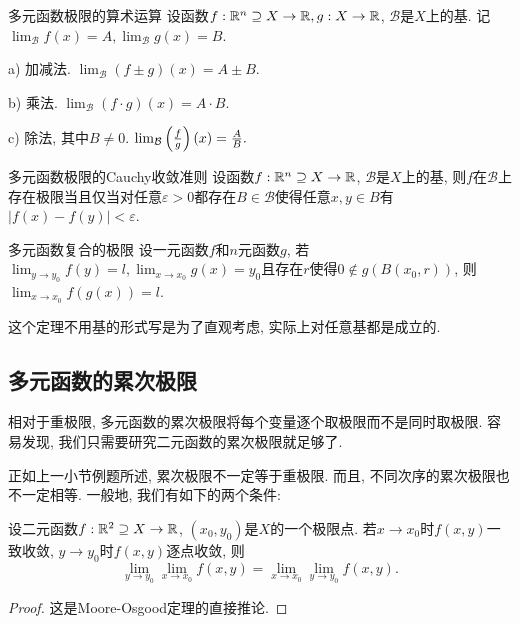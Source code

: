 \begin{theorem}{多元函数极限的算术运算}
	设函数$f:\mathbb{R} ^n \supseteq X \to \mathbb{R}, g:X \to \mathbb{R}$, $\mathcal{B}$是$X$上的基. 记$\lim_{\mathcal{B}} f(x) = A, \lim_{\mathcal{B}} g(x) = B$. 
	
	a) 加减法. $\lim_{\mathcal{B}} (f\pm g)(x) = A\pm B.$
	
	b) 乘法. $\lim_{\mathcal{B}} (f\cdot g)(x) = A \cdot B.$
	
	c) 除法, 其中$B\neq 0$. $\lim_{\mathcal{B}} \left( \frac{f}{g} \right)(x) = \frac{A}{B}.$
\end{theorem}

\begin{theorem}{多元函数极限的Cauchy收敛准则}
	设函数$f:\mathbb{R} ^n \supseteq X \to \mathbb{R}$, $\mathcal{B}$是$X$上的基, 则$f$在$\mathcal{B}$上存在极限当且仅当对任意$\varepsilon >0$都存在$B \in \mathcal{B}$使得任意$x,y \in B$有$|f(x)-f(y)|<\varepsilon$. 
\end{theorem}

\begin{theorem}{多元函数复合的极限}
	设一元函数$f$和$n$元函数$g$, 若$\lim_{y\to y_0} f(y)=l, \lim_{x \to x_0}g(x) = y_0$且存在$r$使得$0 \notin g(B(x_0,r))$, 则$\lim_{x \to x_0} f(g(x)) = l$. 
\end{theorem}
\begin{remark}
	这个定理不用基的形式写是为了直观考虑, 实际上对任意基都是成立的. 
\end{remark}

\subsection{多元函数的累次极限}

相对于重极限, 多元函数的累次极限将每个变量逐个取极限而不是同时取极限. 容易发现, 我们只需要研究二元函数的累次极限就足够了. 

正如上一小节例题所述, 累次极限不一定等于重极限. 而且, 不同次序的累次极限也不一定相等. 一般地, 我们有如下的两个条件: 

\begin{proposition}{}
	设二元函数$f:\mathbb{R} ^2 \supseteq X \to \mathbb{R}$, $(x_0,y_0)$是$X$的一个极限点. 若$x \to x_0$时$f(x,y)$一致收敛, $y \to y_0$时$f(x,y)$逐点收敛, 则$$\lim_{y\to y_0} \lim_{x \to x_0} f(x,y) = \lim_{x\to x_0} \lim_{y \to y_0} f(x,y). $$
\end{proposition}
\begin{proof}
	这是Moore-Osgood定理的直接推论. 
\end{proof}

